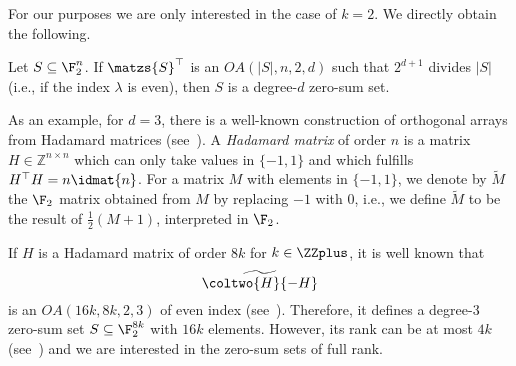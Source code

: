 For our purposes we are only interested in the  case of $k = 2$. We directly obtain the following.

\begin{corollary}
Let $S \subseteq \F_2^n$. If $\matzs{S}^{\top}$ is an $OA(|S|,n,2,d)$ such that $2^{d+1}$ divides $|S|$ (i.e., if the index $\lambda$ is even), then $S$ is a degree-$d$ zero-sum set.
\end{corollary}


As an example, for $d = 3$, there is a well-known construction of orthogonal arrays from Hadamard matrices (see~\cite[pp.\@ 145--148]{hedayat1999orthogonal}). A \emph{Hadamard matrix} of order $n$ is a matrix $H \in \mathbb{Z}^{n \times n}$ which can only take values in $\{-1,1\}$ and which fulfills $H^{\top}H = n \idmat{n}$. For a  matrix $M$ with elements in $\{-1,1\}$, we denote by $\widetilde{M}$ the $\F_2$ matrix obtained from $M$ by replacing $-1$ with $0$, i.e., we define $\widetilde{M}$ to be the result of $\frac{1}{2}(M+1)$, interpreted in $\F_2$.

If $H$ is a Hadamard matrix of order $8k$ for $k \in \ZZplus$, it is well known that 
$$
\widetilde{\coltwo{H}{-H}}
$$
is an $OA(16k,8k,2,3)$ of even index (see~\cite[Theorem 4.16]{hedayat_hadamard}). Therefore, it defines a degree-$3$ zero-sum set $S \subseteq \F_2^{8k}$ with $16k$ elements. However, its rank can be at most $4k$ (see~\cite[Proposition 2]{hadamard_codes}) and we are interested in the zero-sum sets of full rank.

